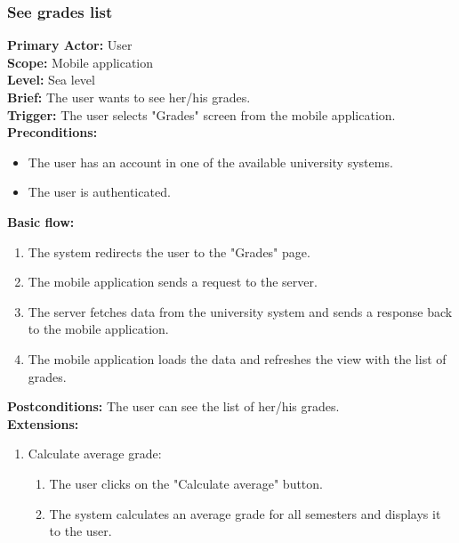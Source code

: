 \subsubsection{\large{See grades list}}
\textbf{Primary Actor:} User\\
\textbf{Scope:} Mobile application\\
\textbf{Level:} Sea level\\
\textbf{Brief:} The user wants to see her/his grades.\\
\textbf{Trigger:} The user selects "Grades" screen from the mobile application.\\
\textbf{Preconditions:}
\begin{itemize}
    \item The user has an account in one of the available university systems.
    \item The user is authenticated.
\end{itemize}
\textbf{Basic flow:}
\begin{enumerate}
    \item The system redirects the user to the "Grades" page.
    \item The mobile application sends a request to the server.
    \item The server fetches data from the university system and sends a response back to the mobile application.
    \item The mobile application loads the data and refreshes the view with the list of grades.
\end{enumerate}
\textbf{Postconditions:}
The user can see the list of her/his grades.\\
\textbf{Extensions:}
\begin{enumerate}[label=\alph*.]
    \item Calculate average grade:
    \begin{enumerate}
        \item The user clicks on the "Calculate average" button.
        \item The system calculates an average grade for all semesters and displays it to the user.
    \end{enumerate}
\end{enumerate}


